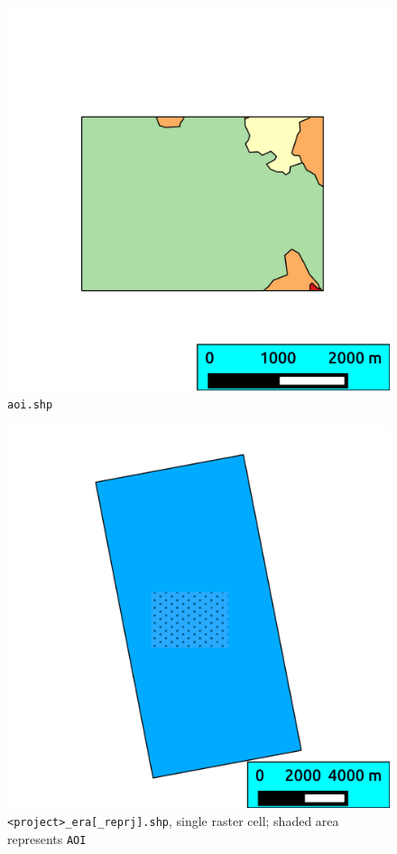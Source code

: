 \documentclass[twoside,a4paper]{refart}
\begin{document}
\begin{figure}
\includegraphics{thumbs/aoi}
\caption{\texttt{aoi.shp}}
\end{figure}

\begin{figure}
\includegraphics{thumbs/era}
\caption{\texttt{<project>\_era[\_reprj].shp}, single raster cell; shaded area represents \texttt{AOI}}
\end{figure}
\end{document}

